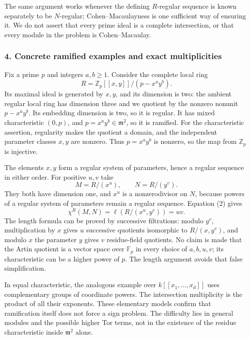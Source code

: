 \documentclass[11pt]{article}
\begin{document}
The same argument works whenever the defining $R$-regular sequence is known separately to be $N$-regular; Cohen--Macaulayness is one sufficient way of ensuring it. We do not assert that every prime ideal is a complete intersection, or that every module in the problem is Cohen--Macaulay.

\subsubsection{4. Concrete ramified examples and exact multiplicities}
Fix a prime $p$ and integers $a,b\ge1$. Consider the complete local ring
\[
 R=\mathbb Z_p[[x,y]]/(p-x^ay^b).
\]
Its maximal ideal is generated by $x,y$, and its dimension is two: the ambient regular local ring has dimension three and we quotient by the nonzero nonunit $p-x^ay^b$. Its embedding dimension is two, so it is regular. It has mixed characteristic $(0,p)$, and $p=x^ay^b\in\mathfrak m^2$, so it is ramified. For the characteristic assertion, regularity makes the quotient a domain, and the independent parameter classes $x,y$ are nonzero. Thus $p=x^ay^b$ is nonzero, so the map from $\mathbb Z_p$ is injective.

The elements $x,y$ form a regular system of parameters, hence a regular sequence in either order. For positive $u,v$ take
\[
 M=R/(x^u),\qquad N=R/(y^v).
\]
They both have dimension one, and $x^u$ is a nonzerodivisor on $N$, because powers of a regular system of parameters remain a regular sequence. Equation (2) gives
\[
 \chi^R(M,N)=\ell(R/(x^u,y^v))=uv.                    \tag{3}
\]
The length formula can be proved by successive filtrations: modulo $y^v$, multiplication by $x$ gives $u$ successive quotients isomorphic to $R/(x,y^v)$, and modulo $x$ the parameter $y$ gives $v$ residue-field quotients. No claim is made that the Artin quotient is a vector space over $\mathbb F_p$ in every choice of $a,b,u,v$; its characteristic can be a higher power of $p$. The length argument avoids that false simplification.

In equal characteristic, the analogous example over $k[[x_1,\ldots,x_d]]$ uses complementary groups of coordinate powers. The intersection multiplicity is the product of all their exponents. These elementary models confirm that ramification itself does not force a sign problem. The difficulty lies in general modules and the possible higher Tor terms, not in the existence of the residue characteristic inside $\mathfrak m^2$ alone.
\end{document}
